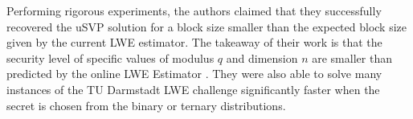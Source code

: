 Performing rigorous experiments, the authors claimed that they successfully recovered the uSVP solution for a block size smaller than the expected block size given by the current LWE estimator. The takeaway of their work is that the security level of specific values of modulus $q$ and dimension $n$ are smaller than predicted by the online LWE Estimator \cite{albrecht2015concrete}. They were also able to solve many instances of the TU Darmstadt LWE challenge \cite{LweChallenge} significantly faster when the secret is chosen from the binary or ternary distributions.





